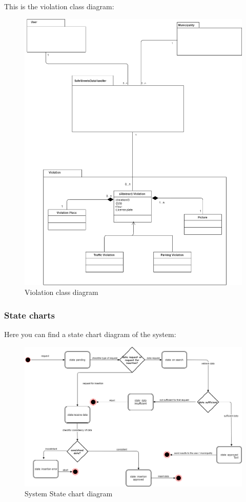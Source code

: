 \documentclass[titlepage]{article}
\begin{document}
This is the violation class diagram:
\begin{figure}[h
]
	\includegraphics[scale=0.4]{UML violation v1.1.png}
	\centering
	\caption{Violation class diagram}
\end{figure}
\FloatBarrier

\subsubsection{State charts }
Here you can find a state chart diagram of the system:

\begin{figure}[h
]
    \includegraphics[scale=0.45]{State_chart.png}
	\centering
	\caption{System State chart diagram}
\end{figure}
\FloatBarrier
\end{document}
